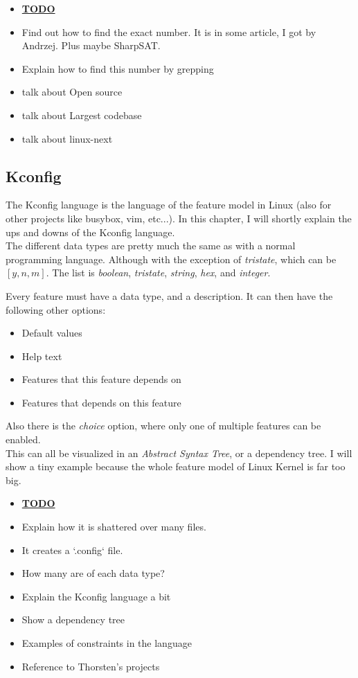 \documentclass[a4paper,11pt]{article}
\begin{document}
\begin{itemize}
    \item \underline{\textbf{TODO}}
    \item Find out how to find the exact number. It is in some article, I got by Andrzej. Plus maybe SharpSAT.
    \item Explain how to find this number by grepping
    \item talk about Open source
    \item talk about Largest codebase
    \item talk about linux-next
\end{itemize}


\subsection{Kconfig}

The Kconfig language is the language of the feature model in Linux (also for 
other projects like busybox, vim, etc...). In this chapter, I will shortly 
explain the ups and downs of the Kconfig language. \\


The different data types are pretty much the same as with a normal programming 
language. Although with the exception of \emph{tristate}, which can be $[y, n, 
m]$. The list is \emph{boolean}, \emph{tristate}, \emph{string}, \emph{hex}, 
and \emph{integer}.

Every feature must have a data type, and a description. It can then have the 
following other options:

\begin{itemize}
    \item Default values
    \item Help text
    \item Features that this feature depends on
    \item Features that depends on this feature
\end{itemize}

Also there is the \emph{choice} option, where only one of multiple features 
can be enabled. \\


This can all be visualized in an \emph{Abstract Syntax Tree}, or a dependency 
tree. I will show a tiny example because the whole feature model of Linux 
Kernel is far too big.


\begin{itemize}
    \item \underline{\textbf{TODO}}
    \item Explain how it is shattered over many files.
    \item It creates a `.config` file.
    \item How many are of each data type?
    \item Explain the Kconfig language a bit
    \item Show a dependency tree
    \item Examples of constraints in the language
    \item Reference to Thorsten's projects
\end{itemize}
\end{document}

